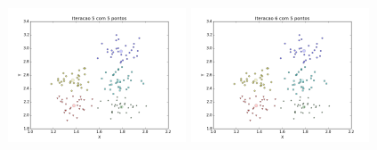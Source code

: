 \documentclass[12pt, a4paper]{article}
\begin{document}
\begin{landscape}
\begin{figure}[!ht]
    \includegraphics[width=0.42\textwidth]{depois_5.png} 
    \includegraphics[width=0.42\textwidth]{depois_6.png}
\end{figure}
\end{landscape}

\newpage

\end{document}
